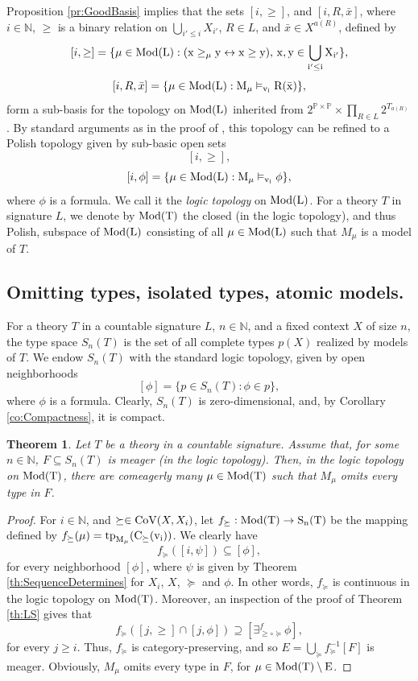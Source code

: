 \documentclass[12pt]{amsart}
\theoremstyle{plain}
\newtheorem{theorem}{Theorem}[section]
\newcommand \Val{{\rm{CoV}}}
\newcommand \Mod{\rm{Mod}}
\newcommand \tp{\rm{tp}}
\newcommand \fr{\scriptscriptstyle{f}}
\newcommand \NN{\mathbb{N}}
\newcommand \PPb{\mathbb{P}}
\begin{document}
	Proposition \ref{pr:GoodBasis} implies that the sets $[i,\geq]$, and $[i,R,\bar{x}]$, where $i \in \NN$, $\geq$ is a binary relation on $\bigcup_{i' \leq i} X_{i'}$, $R \in L$, and $\bar{x} \in X^{a(R)}$, defined by
	\[ [i,\geq]=\{ \mu \in \Mod(L): (x \geq_\mu y \leftrightarrow x \geq y), \, x, y \in \bigcup_{i' \leq i} X_{i'}\}, \]
	\[ [i, R,\bar{x}]=\{\mu \in \Mod(L): M_\mu \vDash_{v_i} R(\bar{x}) \},\]
	form a sub-basis for the topology on $\Mod(L)$ inherited from $2^{\PPb \times \PPb} \times \prod_{R \in L}2^{T_{a(R)}}$. By standard arguments as in the proof of \cite[Theorem 11.4.1]{Gao}, this topology can be refined to a Polish topology given by sub-basic open sets
	\[ [i,\geq], \]
	\[ [i,\phi]=\{\mu \in \Mod(L): M_\mu \vDash_{v_i} \phi \},\]
	where $\phi$ is a formula. We call it the \emph{logic topology} on $\Mod(L)$. For a theory $T$ in signature $L$, we denote by $\Mod(T)$ the closed (in the logic topology), and thus Polish, subspace of $\Mod(L)$ consisting of all $\mu \in \Mod(L)$ such that $M_\mu$ is a model of $T$.
	
	
	\subsection{Omitting types, isolated types, atomic models.}
	
	For a theory $T$ in a countable signature $L$, $n \in \NN$, and a fixed context $X$ of size $n$, the type space $S_n(T)$ is the set of all complete types $p(X)$ realized by models of $T$. We endow $S_n(T)$ with the standard logic topology, given by open neighborhoods $$[\phi]=\{ p \in S_n(T): \phi \in p \},$$ where $\phi$ is a formula. Clearly, $S_n(T)$ is zero-dimensional, and, by Corollary \ref{co:Compactness}, it is compact.
	
\begin{theorem}
\label{th:OM}
Let $T$ be a theory in a countable signature. Assume that, for some $n \in \NN$, $F \subseteq S_n(T)$ is meager (in the logic topology). Then, in the logic topology on $\Mod(T)$, there are comeagerly many $\mu \in \Mod(T)$ such that $M_\mu$ omits every type in $F$.
\end{theorem}
	
\begin{proof}
For $i \in \NN$, and $\succeq \in \Val(X,X_i)$, let $f_{\succeq}:\Mod(T) \rightarrow S_n(T)$ be the mapping defined by $f_{\succeq}(\mu)=\tp_{M_\mu}(C_{\succeq}(v_i))$. We  clearly have $$f_{\succeq}([i, \psi]) \subseteq [\phi],$$ for every neighborhood $[\phi]$, where $\psi$ is given by Theorem \ref{th:SequenceDetermines} for $X_i$, $X$, $\succeq$ and $\phi$. In other words, $f_{\succeq}$ is continuous in the logic topology on $\Mod(T)$.
		Moreover, an inspection of the proof of Theorem \ref{th:LS} gives that $$f_{\succeq}([j, \geq] \cap [j, \phi]) \supseteq [\exists^{\fr}_{\geq \circ \succeq} \phi],$$
		for every $j \geq i$. Thus, $f_{\succeq}$ is category-preserving, and so $E=\bigcup_{ \succeq} f^{-1}_{\succeq}[F]$ is meager. %
		Obviously, $M_\mu$ omits every type in $F$,  for $\mu \in \Mod(T) \setminus E$.
	\end{proof}
	
\end{document}
